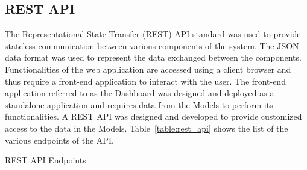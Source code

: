 \subsection{REST API}
The Representational State Transfer (REST) API standard was used to provide stateless communication between various components of the system. 
The JSON data format was used to represent the data exchanged between the components. Functionalities of the web application are accessed using a 
client browser and thus require a front-end application to interact with the user. The front-end application referred to as the Dashboard was
designed and deployed as a standalone application and requires data from the Models to perform its functionalities. A REST API was designed and 
developed to provide customized access to the data in the Models. 
Table~\ref{table:rest_api} shows the list of the various endpoints of the API. 

\begin{table}
    \centering
    \caption{REST API Endpoints}
    \label{table:rest_api}
    \end{table}


